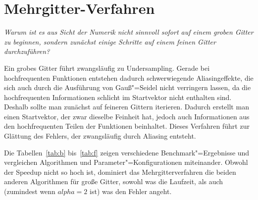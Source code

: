 \documentclass[paper = a4]{scrartcl}
\begin{document}
\section{Mehrgitter-Verfahren}

\emph{Warum ist es aus Sicht der Numerik nicht sinnvoll sofort auf einem groben Gitter zu beginnen, sondern zunächst einige Schritte auf einem feinen Gitter durchzuführen?}

Ein grobes Gitter führt zwangsläufig zu Undersampling. Gerade bei hochfrequenten Funktionen entstehen dadurch schwerwiegende Aliasingeffekte, die sich auch durch die Ausführung von Gauß"=Seidel nicht verringern lassen, da die hochfrequenten Informationen schlicht im Startvektor nicht enthalten sind. Deshalb sollte man zunächst auf feineren Gittern iterieren. Dadurch erstellt man einen Startvektor, der zwar dieselbe Feinheit hat, jedoch auch Informationen aus den hochfrequenten Teilen der Funktionen beinhaltet. Dieses Verfahren führt zur Glättung des Fehlers, der zwangsläufig durch Aliasing entsteht.

Die Tabellen~\ref{tab:b} bis~\ref{tab:f} zeigen verschiedene Benchmark"=Ergebnisse und vergleichen Algorithmen und Parameter"=Konfigurationen miteinander. Obwohl der Speedup nicht so hoch ist, dominiert das Mehrgitterverfahren die beiden anderen Algorithmen für große Gitter, sowohl was die Laufzeit, als auch (zumindest wenn \(alpha=2\) ist) was den Fehler angeht.
\end{document}
